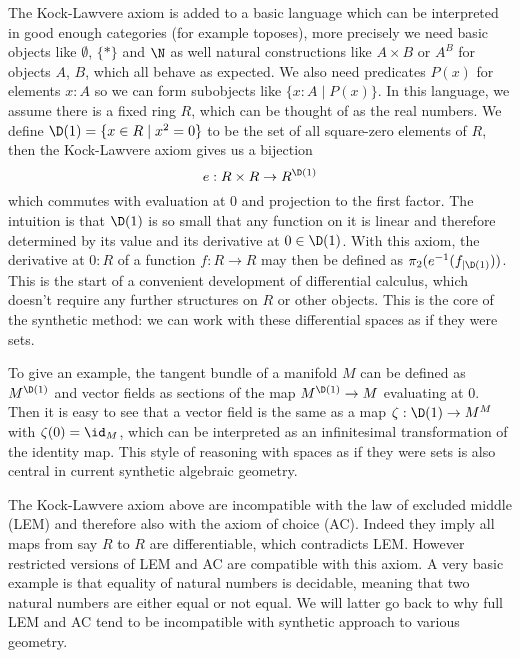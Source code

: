 The Kock-Lawvere axiom is added to a basic language which can be interpreted in good enough categories (for example toposes), more precisely we need basic objects like $\emptyset$, $\{\ast\}$ and $\N$ as well natural constructions like $A\times B$ or $A^B$ for objects $A$, $B$, which all behave as expected. We also need predicates $P(x)$ for elements $x:A$ so we can form subobjects like $\{x:A\mid P(x)\}$.
In this language, we assume there is a fixed ring $R$, which can be thought of as the real numbers. We define $\D(1)=\{x\in R\mid x^2=0\}$ to be the set of all square-zero elements of $R$, then the Kock-Lawvere axiom gives us a bijection
\[ e : R \times R  \to R^{\D(1)} \]
which commutes with evaluation at $0$ and projection to the first factor.
The intuition is that $\D(1)$ is so small that any function on it is linear and therefore determined by its value and its derivative at $0\in\D(1)$.
With this axiom, the derivative at $0:R$ of a function $f : R \to R$ may then be defined as $\pi_2(e^{-1}(f_{\vert \D(1)}))$. This is the start of a convenient development of differential calculus, which doesn't require any further structures on $R$ or other objects. This is the core of the synthetic method: we can work with these differential spaces as if they were sets.

To give an example, the tangent bundle of a manifold $M$ can be defined as $M^{\D(1)}$ and vector fields as sections of the map $M^{\D(1)}\to M$ evaluating at $0$. Then it is easy to see that a vector field is the same as a map $\zeta:\D(1)\to M^M$ with $\zeta(0)=\id_M$, which can be interpreted as an infinitesimal transformation of the identity map. This style of reasoning with spaces as if they were sets is also central in current synthetic algebraic geometry. 

The Kock-Lawvere axiom above are incompatible with the law of excluded middle (LEM) and therefore also with the axiom of choice (AC). Indeed they imply all maps from say $R$ to $R$ are differentiable, which contradicts LEM. 
However restricted versions of LEM and AC are compatible with this axiom. A very basic example is that equality of natural numbers is decidable, meaning that two natural numbers are either equal or not equal. We will latter go back to why full LEM and AC tend to be incompatible with synthetic approach to various geometry.


